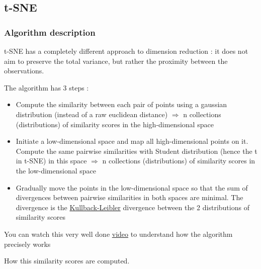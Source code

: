 \documentclass[
]{book}
\providecommand{\tightlist}{%
  \setlength{\itemsep}{0pt}\setlength{\parskip}{0pt}}
\begin{document}
\hypertarget{t-sne}{%
\subsection{t-SNE}\label{t-sne}}

\hypertarget{algorithm-description}{%
\subsubsection{Algorithm description}\label{algorithm-description}}

t-SNE has a completely different approach to dimension reduction : it does not aim to preserve the total variance, but rather the proximity between the observations.

The algorithm has 3 steps :

\begin{itemize}
\tightlist
\item
  Compute the similarity between each pair of points using a gaussian distribution (instead of a raw euclidean distance) \(\Rightarrow\) n collections (distributions) of similarity scores in the high-dimensional space
\item
  Initiate a low-dimensional space and map all high-dimensional points on it. Compute the same pairwise similarities with Student distribution (hence the t in t-SNE) in this space \(\Rightarrow\) n collections (distributions) of similarity scores in the low-dimensional space
\item
  Gradually move the points in the low-dimensional space so that the sum of divergences between pairwise similarities in both spaces are minimal. The divergence is the \href{https://en.wikipedia.org/wiki/Kullback\%E2\%80\%93Leibler_divergence}{Kullback-Leibler} divergence between the 2 distributions of similarity scores
\end{itemize}

You can watch this very well done \href{https://www.youtube.com/watch?v=NEaUSP4YerM}{video} to understand how the algorithm precisely works

How this similarity scores are computed.
\end{document}
